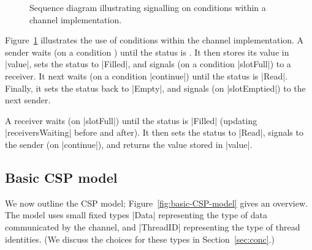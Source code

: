 \begin{figure}
\begin{center}
\def\rx{3} %
\def\height{4}  %
\def\delta{0.8} %
\end{center}
\caption{Sequence diagram illustrating signalling on conditions within a channel
  implementation. \label{fig:channel-sd}} 
\end{figure}


Figure~\ref{fig:channel-sd} illustrates the use of conditions within the
channel implementation. 
A sender waits (on a condition ) until the status is
.  It then stores its value in |value|, sets the status to
|Filled|, and signals (on a condition |slotFull|) to a receiver.  It next 
waits (on a condition |continue|) until the status is |Read|.  Finally, it
sets the status back to |Empty|, and signals (on |slotEmptied|) to the next
sender.

A receiver waits (on |slotFull|) until the status is |Filled| (updating
|receiversWaiting| before and after).  It then sets the status to |Read|,
signals to the sender (on |continue|), and returns the value stored in
|value|.


\subsection{Basic CSP model}

We now outline the CSP model; Figure~\ref{fig:basic-CSP-model} gives an
overview.  The model uses small fixed types |Data| representing the type of
data communicated by the channel, and |ThreadID| representing the type of
thread identities.  (We discuss the choices for these types in
Section~\ref{sec:conc}.)


